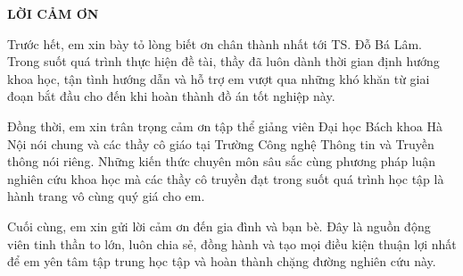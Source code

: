 \documentclass[../DoAn.tex]{subfiles}
\begin{document}
\begin{center}
    \Large{\textbf{LỜI CẢM ƠN}}\\
\end{center}
\vspace{1cm}
Trước hết, em xin bày tỏ lòng biết ơn chân thành nhất tới TS. Đỗ Bá Lâm. Trong suốt quá trình thực hiện đề tài, thầy đã luôn dành thời gian định hướng khoa học, tận tình hướng dẫn và hỗ trợ em vượt qua những khó khăn từ giai đoạn bắt đầu cho đến khi hoàn thành đồ án tốt nghiệp này.

Đồng thời, em xin trân trọng cảm ơn tập thể giảng viên Đại học Bách khoa Hà Nội nói chung và các thầy cô giáo tại Trường Công nghệ Thông tin và Truyền thông nói riêng. Những kiến thức chuyên môn sâu sắc cùng phương pháp luận nghiên cứu khoa học mà các thầy cô truyền đạt trong suốt quá trình học tập là hành trang vô cùng quý giá cho em.

Cuối cùng, em xin gửi lời cảm ơn đến gia đình và bạn bè. Đây là nguồn động viên tinh thần to lớn, luôn chia sẻ, đồng hành và tạo mọi điều kiện thuận lợi nhất để em yên tâm tập trung học tập và hoàn thành chặng đường nghiên cứu này.
\end{document}
